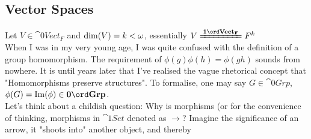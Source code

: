 \subsection{Vector Spaces}

Let \( V \in \cat{0}{Vect_F} \) and \(\operatorname{dim}(V)=k<\omega \), essentially \(V \iso{Vect_F} F^k \) \\

When I was in my very young age, I was quite confused with the definition of a group homomorphism. The requirement of \(\phi(g)\phi(h)=\phi(gh)\) sounds from nowhere. It is until years later that I've realised the vague rhetorical concept that "Homomorphisms preserve structures". To formalise, one may say \(G\in \cat{0}{Grp}\), \(\phi(G)=\oIm (\phi)\in \cat{0}{Grp}\). \\

Let's think about a childish question: Why is morphisms (or for the convenience of thinking, morphisms in \(\cat{1}{Set}\) denoted as \(\to\)? Imagine the significance of an arrow, it "shoots into" another object, and thereby 
